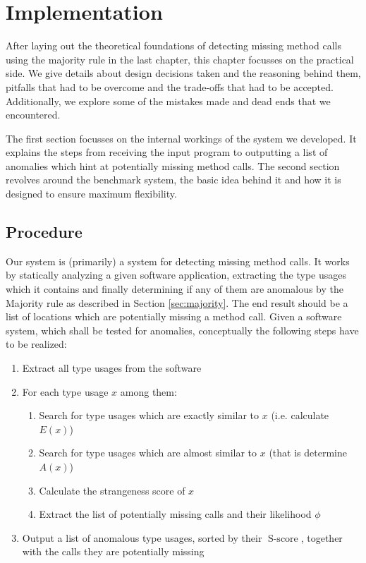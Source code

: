 \chapter{Implementation}\label{ch:impl}


After laying out the theoretical foundations of detecting missing method calls using the majority rule in the last chapter, this chapter focusses on the practical side.
We give details about design decisions taken and the reasoning behind them, pitfalls that had to be overcome and the trade-offs that had to be accepted.
Additionally, we explore some of the mistakes made and dead ends that we encountered.

The first section focusses on the internal workings of the system we developed.
It explains the steps from receiving the input program to outputting a list of anomalies which hint at potentially missing method calls.
The second section revolves around the benchmark system, the basic idea behind it and how it is designed to ensure maximum flexibility.

\section{Procedure}

Our system is (primarily) a system for detecting missing method calls.
It works by statically analyzing a given software application, extracting the type usages which it contains and finally determining if any of them are anomalous by the Majority rule as described in Section \ref{sec:majority}.
The end result should be a list of locations which are potentially missing a method call.
Given a software system, which shall be tested for anomalies, conceptually the following steps have to be realized:

\begin{enumerate}
    \item Extract all type usages from the software
    \item For each type usage $x$ among them:
    \begin{enumerate}
        \item Search for type usages which are exactly similar to $x$ (i.e. calculate $E(x)$)
        \item Search for type usages which are almost similar to $x$ (that is determine $A(x)$)
        \item Calculate the strangeness score of $x$
        \item Extract the list of potentially missing calls and their likelihood $\phi$
    \end{enumerate}
    \item Output a list of anomalous type usages, sorted by their $\operatorname{S-score}$, together with the calls they are potentially missing
\end{enumerate}

